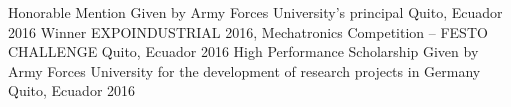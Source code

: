 \begin{cvhonors}
  \cvhonor
    {Honorable Mention}
    {Given by Army Forces University's principal}
    {Quito, Ecuador}
    {2016}
  \cvhonor
    {Winner}
    {EXPOINDUSTRIAL 2016, Mechatronics Competition – FESTO CHALLENGE}
    {Quito, Ecuador}
    {2016}
  \cvhonor
    {High Performance Scholarship}
    {Given by Army Forces University for the development of research projects in Germany }
    {Quito, Ecuador}
    {2016}
\end{cvhonors}

